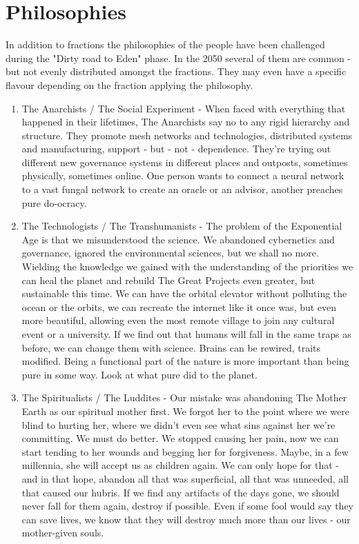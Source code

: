\chapter{Philosophies}

In addition to fractions the philosophies of the people have been challenged during the "Dirty road to Eden" phase. In the 2050 several of them are common - but not evenly distributed amongst the fractions. They may even have a specific flavour depending on the fraction applying the philosophy.

\begin{enumerate}
\item The Anarchists / The Social Experiment - When faced with everything that happened in their lifetimes, The Anarchists say no to any rigid hierarchy and structure. They promote mesh networks and technologies, distributed systems and manufacturing, support - but - not - dependence. They're trying out different new governance systems in different places and outposts, sometimes physically, sometimes online. One person wants to connect a neural network to a vast fungal network to create an oracle or an advisor, another preaches pure do-ocracy.

\item The Technologists / The Transhumanists - The problem of the Exponential Age is that we misunderstood the science. We abandoned cybernetics and governance, ignored the environmental sciences, but we shall no more. Wielding the knowledge we gained with the understanding of the priorities we can heal the planet and rebuild The Great Projects even greater, but sustainable this time. We can have the orbital elevator without polluting the ocean or the orbits, we can recreate the internet like it once was, but even more beautiful, allowing even the most remote village to join any cultural event or a university. If we find out that humans will fall in the same traps as before, we can change them with science. Brains can be rewired, traits modified. Being a functional part of the nature is more important than being pure in some way. Look at what pure did to the planet.

\item The Spiritualists / The Luddites - Our mistake was abandoning The Mother Earth as our spiritual mother first. We forgot her to the point where we were blind to hurting her, where we didn't even see what sins against her we're committing. We must do better. We stopped causing her pain, now we can start tending to her wounds and begging her for forgiveness. Maybe, in a few millennia, she will accept us as children again. We can only hope for that - and in that hope, abandon all that was superficial, all that was unneeded, all that caused our hubris. If we find any artifacts of the days gone, we should never fall for them again, destroy if possible. Even if some fool would say they can save lives, we know that they will destroy much more than our lives - our mother-given souls.


\end{enumerate}
